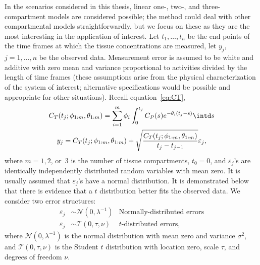 In the scenarios considered in this thesis, linear one-, two-, and
three-compartment models are considered possible; the method could deal with
other compartmental models straightforwardly, but we focus on these as they
are the most interesting in the application of interest. Let $t_1, \dots, t_n$
be the end points of the time frames at which the tissue concentrations are
measured, let $y_j$, $j = 1, \dots, n$ be the observed data. Measurement error
is assumed to be white and additive with zero mean and variance proportional
to activities divided by the length of time frames (these assumptions arise
from the physical characterization of the \pet system of interest; alternative
specifications would be possible and appropriate for other situations).
Recall equation~\eqref{eq:CT},
\begin{gather*}
  C_T(t_j;\phi_{1:m},\theta_{1:m}) =
  \sum_{i=1}^m \phi_i\int_0^{t_j}C_P(s)e^{-\theta_i(t_j-s)} \intd s \\
  y_j = C_T(t_j;\phi_{1:m},\theta_{1:m}) +
  \sqrt{\frac{C_T(t_j;\phi_{1:m},\theta_{1:m})} {t_j - t_{j-1}}}
  \varepsilon_j,
\end{gather*}
where $m = 1, 2$, or~$3$ is the number of tissue compartments, $t_0 = 0$,
and $\varepsilon_j$'s are identically independently distributed random
variables with mean zero. It is usually assumed that $\varepsilon_j$'s have
a normal distribution. It is demonstrated below that there is evidence that
a $t$ distribution better fits the observed data. We consider two error
structures:
\begin{align*}
  \varepsilon_j &\sim \mathcal{N}(0,\lambda^{-1})
  &\text{Normally-distributed errors} \\
  \varepsilon_j &\sim \mathcal{T}(0,\tau,\nu)
  &\text{$t$-distributed errors},
\end{align*}
where $\mathcal{N}(0,\lambda^{-1})$ is the normal distribution with mean zero
and variance $\sigma^2$, and $\mathcal{T}(0,\tau,\nu)$ is the Student $t$
distribution with location zero, scale $\tau$, and degrees of freedom $\nu$.
